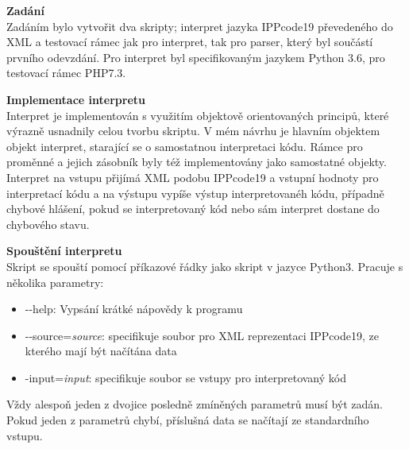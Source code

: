 \documentclass[a4paper, 11pt]{article}
\begin{document}
\large{{\textbf{Zadání}}\\
Zadáním bylo vytvořit dva skripty; interpret jazyka IPPcode19 převedeného do XML a testovací rámec jak pro interpret, tak pro parser, který byl součástí prvního odevzdání. Pro interpret byl specifikovaným jazykem Python 3.6, pro testovací rámec PHP7.3.\\

\large{{\textbf{Implementace interpretu}}\\
Interpret je implementován s využitím objektově orientovaných principů, které výrazně usnadnily celou tvorbu skriptu. V mém návrhu je hlavním objektem objekt interpret, starající se o samostatnou interpretaci kódu. Rámce pro proměnné a jejich zásobník byly též implementovány jako samostatné objekty.\\
Interpret na vstupu přijímá XML podobu IPPcode19 a vstupní hodnoty pro interpretací kódu a na výstupu vypíše výstup interpretovanéh kódu, případně chybové hlášení, pokud se interpretovaný kód nebo sám interpret dostane do chybového stavu.\\


\large{{\textbf{Spouštění interpretu}}\\
Skript se spouští pomocí příkazové řádky jako skript v jazyce Python3. Pracuje s několika parametry:\\
\begin{itemize}
	\item -{}-help: Vypsání krátké nápovědy k programu
	\item -{}-source=\textit{source}: specifikuje soubor pro XML reprezentaci IPPcode19, ze kterého mají být načítána data
	\item -{}input=\textit{input}: specifikuje soubor se vstupy pro interpretovaný kód
\end{itemize}
Vždy alespoň jeden z dvojice posledně zmíněných parametrů musí být zadán. Pokud jeden z parametrů chybí, příslušná data se načítají ze standardního vstupu.\\

}}}
\end{document}
